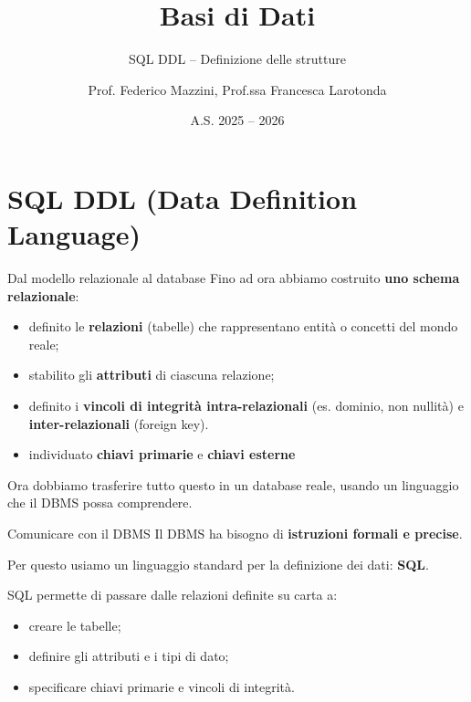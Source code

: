 \documentclass{beamer}
\title{Basi di Dati}
\subtitle{SQL DDL -- Definizione delle strutture}
\author{Prof. Federico Mazzini, Prof.ssa Francesca Larotonda}
\institute{I.I.S. Francesco Alberghetti}
\date{A.S. 2025 -- 2026}
\begin{document}
\begin{frame}
\titlepage
\end{frame}

\section{SQL DDL (Data Definition Language)}

\begin{frame}{Dal modello relazionale al database}
Fino ad ora abbiamo costruito \textbf{uno schema relazionale}:
\begin{itemize}
    \item definito le \textbf{relazioni} (tabelle) che rappresentano entità o concetti del mondo reale;
    \item stabilito gli \textbf{attributi} di ciascuna relazione;
    \item definito i \textbf{vincoli di integrità intra-relazionali} (es. dominio, non nullità) e \textbf{inter-relazionali} (foreign key).
    \item individuato \textbf{chiavi primarie} e \textbf{chiavi esterne}
\end{itemize}

\medskip
\alert{Ora dobbiamo trasferire tutto questo in un database reale, usando un linguaggio che il DBMS possa comprendere.}
\end{frame}

\begin{frame}{Comunicare con il DBMS}
Il DBMS ha bisogno di \textbf{istruzioni formali e precise}.

\medskip
Per questo usiamo un linguaggio standard per la definizione dei dati: \textbf{SQL}.

\medskip
SQL permette di passare dalle relazioni definite su carta a:
\begin{itemize}
    \item creare le tabelle;
    \item definire gli attributi e i tipi di dato;
    \item specificare chiavi primarie e vincoli di integrità.
\end{itemize}
\end{frame}
\end{document}
